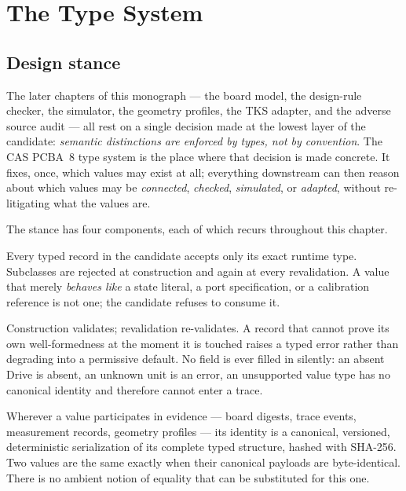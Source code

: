 \chapter{The Type System}\label{ch04:chapter}

\section{Design stance}\label{ch04:sec:stance}

The later chapters of this monograph --- the board model, the design-rule
checker, the simulator, the geometry profiles, the TKS adapter, and the
adverse source audit --- all rest on a single decision made at the lowest layer
of the candidate: \emph{semantic distinctions are enforced by types, not by
convention}. The CAS PCBA~8 type system is the place where that decision is
made concrete. It fixes, once, which values may exist at all; everything
downstream can then reason about which values may be \emph{connected},
\emph{checked}, \emph{simulated}, or \emph{adapted}, without re-litigating
what the values are.

The stance has four components, each of which recurs throughout this
chapter.

\begin{ruleenv}\label{ch04:rule:exact}
Every typed record in the candidate accepts only its exact runtime type.
Subclasses are rejected at construction and again at every revalidation.
A value that merely \emph{behaves like} a state literal, a port
specification, or a calibration reference is not one; the candidate refuses
to consume it.
\end{ruleenv}

\begin{ruleenv}\label{ch04:rule:failclosed}
Construction validates; revalidation re-validates. A record that cannot
prove its own well-formedness at the moment it is touched raises a typed
error rather than degrading into a permissive default. No field is ever
filled in silently: an absent Drive is absent, an unknown unit is an error,
an unsupported value type has no canonical identity and therefore cannot
enter a trace.
\end{ruleenv}

\begin{ruleenv}\label{ch04:rule:identity}
Wherever a value participates in evidence --- board digests, trace events,
measurement records, geometry profiles --- its identity is a canonical,
versioned, deterministic serialization of its complete typed structure,
hashed with SHA-256. Two values are the same exactly when their canonical
payloads are byte-identical. There is no ambient notion of equality that
can be substituted for this one.
\end{ruleenv}

